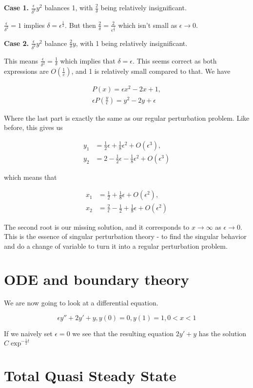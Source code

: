 \documentclass[12pt]{article}
\begin{document}
\textbf{Case 1.} $\frac{\epsilon}{\delta^2} y^2$ balances 1, with $\frac{2}{\delta}$
being relatively insignificant.

$\frac{\epsilon}{\delta^2} = 1$ implies $\delta = \epsilon^{\frac{1}{2}}$. But
then $\frac{2}{\delta} = \frac{2}{\epsilon^{\frac{1}{2}}}$ which isn't small as
$\epsilon \to 0$.

\textbf{Case 2.} $\frac{\epsilon}{\delta^2} y^2$ balance $\frac{2}{\delta} y$,
with 1 being relatively insignificant.

This means $\frac{\epsilon}{\delta^2} = \frac{1}{\delta}$ which implies that
$\delta = \epsilon$. This seems correct as both expressions are
$O(\frac{1}{e})$, and 1 is relatively small compared to that. We have

\begin{align}
P(x) = \epsilon x^2 - 2x + 1, \\
\epsilon P(\frac{y}{\epsilon}) = y^2 - 2 y + \epsilon
\end{align}

Where the last part is exactly the same as our regular perturbation problem.
Like before, this gives us

\begin{align}
y_1 &= \frac{1}{2} \epsilon + \frac{1}{8} \epsilon^2 + O(\epsilon^3), \\
y_2 &= 2 - \frac{1}{2} \epsilon - \frac{1}{8} \epsilon^2 + O(\epsilon^3)
\end{align}

which means that

\begin{align}
x_1 &= \frac{1}{2} + \frac{1}{8} \epsilon + O(\epsilon^2), \\
x_2 &= \frac{2}{\epsilon} - \frac{1}{2} + \frac{1}{8} \epsilon + O(\epsilon^2)
\end{align}

The second root is our missing solution, and it corresponds to $x \to \infty$ as
$\epsilon \to 0$. This is the essence of singular perturbation theory - to find
the singular behavior and do a change of variable to turn it into a regular
perturbation problem.

\section{ODE and boundary theory}

We are now going to look at a differential equation.

\begin{equation}
\epsilon y'' + 2 y' + y, y(0)=0, y(1)=1, 0 < x < 1
\end{equation}

If we naively set $\epsilon = 0$ we see that the resulting equation $2 y' + y$
has the solution $C \exp^{- \frac{1}{2}t}$


\section{Total Quasi Steady State}
\end{document}
